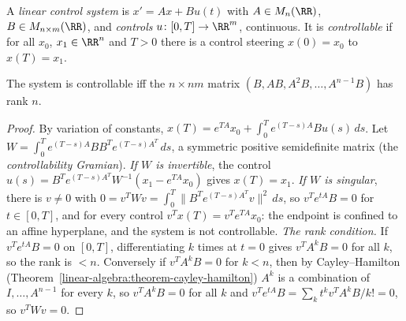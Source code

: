 \begin{definition}\label{ordinary-differential-equations:definition-controllable}
A \emph{linear control system} is $x' = Ax + Bu(t)$ with $A \in M_n(\RR)$, $B \in M_{n \times m}(\RR)$, and \emph{controls} $u \colon [0, T] \to \RR^m$, continuous. It is \emph{controllable} if for all $x_0$, $x_1 \in \RR^n$ and
$T > 0$ there is a control steering $x(0) = x_0$ to $x(T) = x_1$.
\end{definition}

\begin{theorem}\label{ordinary-differential-equations:theorem-kalman}
The system is controllable iff the $n \times nm$ matrix $(B, AB, A^2B, \ldots, A^{n-1}B)$ has rank $n$.
\end{theorem}

\begin{proof}
By variation of constants, $x(T) = e^{TA}x_0 + \int_0^Te^{(T-s)A}Bu(s)\,ds$. Let $W = \int_0^Te^{(T-s)A}BB^Te^{(T-s)A^T}\,ds$, a symmetric positive semidefinite matrix (the \emph{controllability Gramian}). \emph{If $W$ is invertible},
the control $u(s) = B^Te^{(T-s)A^T}W^{-1}(x_1 - e^{TA}x_0)$ gives $x(T) = x_1$. \emph{If $W$ is singular}, there is $v \neq 0$ with $0 = v^TWv = \int_0^T\|B^Te^{(T-s)A^T}v\|^2\,ds$, so $v^Te^{tA}B = 0$ for $t \in [0, T]$, and for every control
$v^Tx(T) = v^Te^{TA}x_0$: the endpoint is confined to an affine hyperplane, and the system is not controllable. \emph{The rank condition.} If $v^Te^{tA}B = 0$ on $[0, T]$, differentiating $k$ times at $t = 0$ gives $v^TA^kB = 0$ for all $k$,
so the rank is $< n$. Conversely if $v^TA^kB = 0$ for $k < n$, then by Cayley--Hamilton (Theorem~\ref{linear-algebra:theorem-cayley-hamilton}) $A^k$ is a combination of $I, \ldots, A^{n-1}$ for every $k$, so $v^TA^kB = 0$ for all $k$ and
$v^Te^{tA}B = \sum_kt^kv^TA^kB/k! = 0$, so $v^TWv = 0$.
\end{proof}

